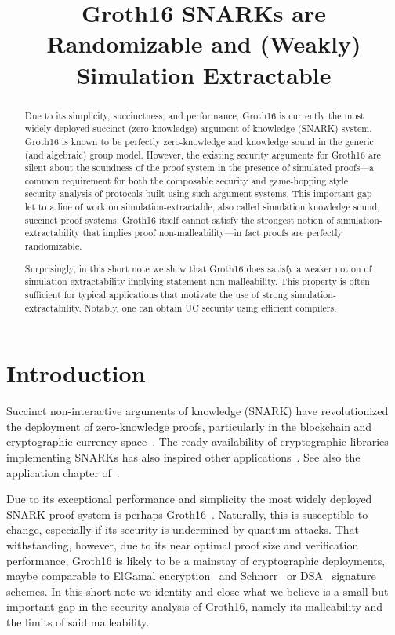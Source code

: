 \documentclass[a4paper, 11pt]{article}
\title{Groth16 SNARKs are \\ Randomizable and (Weakly) Simulation Extractable}
\newcommand{\Gro}{\textsf{Groth16}}
\begin{document}
\maketitle

\begin{abstract}
  Due to its simplicity, succinctness, and performance, \Gro{} is
  currently the most widely deployed succinct (zero-knowledge) argument of
  knowledge (SNARK) system. \Gro{} is
  known to be perfectly zero-knowledge and knowledge sound in the generic (and
  algebraic) group model. However, the existing security arguments for \Gro{} are
  silent about the soundness of the proof system in the presence of simulated
  proofs---a common requirement for both the composable security and game-hopping
  style security analysis of
  protocols built using such argument systems. This important gap let to a line of work on
  simulation-extractable, also called simulation knowledge sound, succinct proof systems.
  \Gro{} itself cannot satisfy the strongest
  notion of simulation-extractability that implies proof
  non-malleability---in fact proofs are perfectly randomizable.

  Surprisingly, in this short note we show that \Gro{} does satisfy a
  weaker notion of simulation-extractability implying statement
  non-malleability. This property is often sufficient for typical
  applications that motivate the use of strong
  simulation-extractability. Notably, one can obtain UC security using
  efficient compilers.
\end{abstract}

\section{Introduction}


Succinct non-interactive arguments of knowledge (SNARK) have
revolutionized the deployment of zero-knowledge proofs, particularly
in the blockchain and cryptographic currency
space~\cite{DBLP:conf/sp/Ben-SassonCG0MTV14, kosba2016hawk,
  DBLP:journals/iacr/KerberKK20a, DBLP:journals/iacr/BoweCGMMW18}. The
ready availability of cryptographic libraries implementing SNARKs has
also inspired other
applications~\cite{DBLP:conf/sp/NavehT16,DBLP:conf/sp/Delignat-Lavaud16}. See
also the application chapter of~\cite{zkproof}.

Due to its exceptional performance and simplicity the most widely
deployed SNARK proof system is perhaps \Gro{}~\cite{gro16}. Naturally,
this is susceptible to change, especially if its security is
undermined by quantum attacks. That withstanding, however, due to its
near optimal proof size and verification performance, \Gro{} is likely
to be a mainstay of cryptographic deployments, maybe comparable to
ElGamal encryption~\cite{DBLP:journals/tit/Elgamal85} and
Schnorr~\cite{DBLP:journals/joc/Schnorr91} or
DSA~\cite{dsa} signature schemes.
%
In this short note we identity and close what we believe is a small
but important gap in the security analysis of \Gro{}, namely its
malleability and the limits of said malleability.
\end{document}
